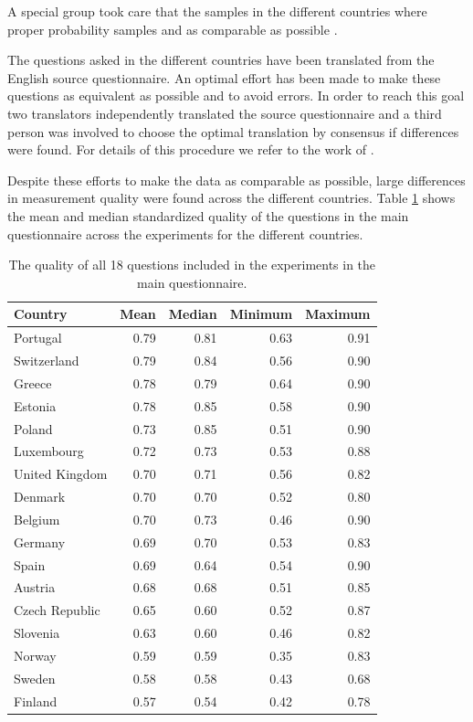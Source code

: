 \documentclass[a4paper,12pt]{article}
\begin{document}
A special group took care that the samples in the different countries where proper probability samples and as comparable as possible \citep{hader_2007}. 

The questions asked in the different countries have been translated from the English source questionnaire. An optimal effort has been made to make these questions as equivalent as possible and to avoid errors. In order to reach this goal two translators independently translated the source questionnaire and a third person was involved to choose the optimal translation by consensus if differences were found. For details of this procedure we refer to the work of \citet{harkness_cross-cultural_2002}.

	 Despite these efforts to make the data as comparable as possible, large differences in measurement quality were found across the different countries.  Table \ref{tab:countries} shows the mean and median standardized quality of the questions in the main questionnaire across the experiments for the different countries.

\begin{table}[hbt]\centering\caption{The quality of all 18 questions included in the experiments in the main questionnaire.\label{tab:countries}}
\begin{tabular}{lrrrr}
\hline
Country&Mean&Median&Minimum&Maximum\\\hline
Portugal&0.79&0.81&0.63&0.91\\
Switzerland&0.79&0.84&0.56&0.90\\
Greece&0.78&0.79&0.64&0.90\\
Estonia&0.78&0.85&0.58&0.90\\
Poland&0.73&0.85&0.51&0.90\\
Luxembourg&0.72&0.73&0.53&0.88\\
United Kingdom&0.70&0.71&0.56&0.82\\
Denmark&0.70&0.70&0.52&0.80\\
Belgium&0.70&0.73&0.46&0.90\\
Germany&0.69&0.70&0.53&0.83\\
Spain&0.69&0.64&0.54&0.90\\
Austria&0.68&0.68&0.51&0.85\\
Czech Republic&0.65&0.60&0.52&0.87\\
Slovenia&0.63&0.60&0.46&0.82\\
Norway&0.59&0.59&0.35&0.83\\
Sweden&0.58&0.58&0.43&0.68\\
Finland&0.57&0.54&0.42&0.78\\
	\hline
\end{tabular}
\end{table}
\end{document}
